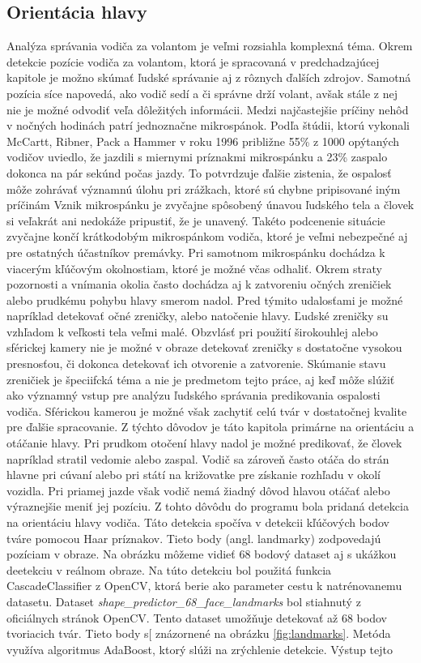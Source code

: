 \documentclass[slovak,master,dept460,male,cpp,cpdeclaration]{diploma}
\begin{document}
 
\newpage
\subsection{Orientácia hlavy}
\label{sec:headOrientation}
Analýza správania vodiča za volantom je  veľmi rozsiahla komplexná téma. Okrem detekcie pozície vodiča za volantom, ktorá je spracovaná v predchadzajúcej kapitole je možno skúmať ľudské správanie aj z rôznych ďalších zdrojov. Samotná pozícia  síce napovedá, ako vodič sedí a či správne drží volant, avšak  stále z nej nie je možné odvodiť veľa dôležitých informácii.  Medzi najčastejšie príčiny nehôd v nočných hodinách patrí jednoznačne mikrospánok. Podľa štúdii\cite{mccartt1996scope}, ktorú vykonali McCartt, Ribner, Pack a Hammer  v roku 1996 približne 55\% z 1000 opýtaných vodičov uviedlo, že jazdili s miernymi príznakmi mikrospánku a 23\% zaspalo dokonca na pár sekúnd počas jazdy. To potvrdzuje ďalšie zistenia, že ospalosť môže zohrávať významnú úlohu pri zrážkach, ktoré sú chybne pripisované iným príčinám Vznik mikrospánku je zvyčajne spôsobený únavou ľudského tela  a človek si veľakrát ani nedokáže pripustiť, že je unavený. Takéto podcenenie situácie zvyčajne končí krátkodobým mikrospánkom  vodiča, ktoré je  veľmi nebezpečné aj pre ostatných účastníkov premávky.  Pri samotnom mikrospánku dochádza  k viacerým kľúčovým okolnostiam, ktoré je možné včas odhaliť. Okrem straty pozornosti a vnímania okolia často dochádza aj k zatvoreniu očných zreničiek alebo prudkému pohybu hlavy smerom nadol. Pred týmito udalosťami je možné napríklad detekovať  očné zreničky, alebo natočenie hlavy. Ľudské zreničky su vzhľadom  k veľkosti tela veľmi malé. Obzvlásť pri použití širokouhlej alebo sférickej kamery nie je možné v obraze detekovať  zreničky s dostatočne vysokou presnosťou, či dokonca detekovať ich otvorenie a zatvorenie.  Skúmanie stavu zreničiek je špeciifcká téma a nie je predmetom tejto práce, aj keď môže slúžiť ako významný vstup pre analýzu ľudského správania  predikovania ospalosti vodiča. Sférickou kamerou je možné  však  zachytiť celú tvár v dostatočnej kvalite pre ďalšie spracovanie. Z týchto dôvodov je  táto kapitola  primárne na orientáciu a otáčanie hlavy. Pri prudkom otočení hlavy nadol je možné predikovať, že človek napríklad stratil vedomie alebo zaspal. Vodič sa zároveň často otáča do strán  hlavne pri cúvaní alebo pri  státí na križovatke pre získanie rozhľadu v okolí vozidla.  Pri priamej jazde však vodič nemá žiadný dôvod hlavou otáčať alebo výraznejšie meniť jej pozíciu. Z tohto dôvôdu  do programu  bola pridaná detekcia na orientáciu hlavy vodiča. Táto detekcia spočíva v detekcii  kľúčových bodov tváre pomocou Haar príznakov.  Tieto body (angl. landmarky) zodpovedajú pozíciam v obraze. Na obrázku môžeme vidieť 68 bodový dataset  aj s ukážkou deetekciu  v reálnom obraze. Na túto detekciu bol použitá funkcia CascadeClassifier z OpenCV, ktorá berie ako parameter  cestu k natrénovanemu datasetu. Dataset \textit{shape\_predictor\_68\_face\_landmarks} bol stiahnutý z oficiálnych stránok OpenCV. Tento dataset  umožňuje detekovať až 68 bodov tvoriacich tvár. Tieto body s[ znázornené na obrázku \ref{fig:landmarks}. Metóda využíva algoritmus AdaBoost, ktorý slúži na zrýchlenie detekcie. Výstup tejto 
\end{document}
